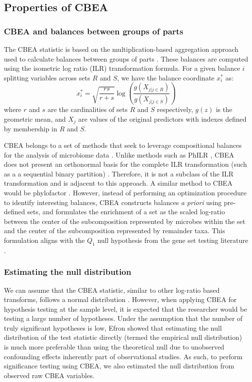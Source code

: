 \documentclass[10pt,letterpaper]{article}
\begin{document}
\subsection*{Properties of CBEA}
\subsubsection*{CBEA and balances between groups of parts}
The CBEA statistic is based on the multiplication-based aggregation approach used to calculate balances between groups of parts \cite{egozcue2005}. These balances are computed using the isometric log ratio (ILR) transformation \cite{egozcue2003} formula. For a given balance $i$ splitting variables across sets $R$ and $S$, we have the balance coordinate $x^{*}_{i}$ as: 
\begin{equation}\label{ilr_standard}
    x^{*}_i = \sqrt{\frac{rs}{r+s}} \log\left(\frac{g(X_{j|j \in R})}{g(X_{j|j \in S})}\right)
\end{equation}
where $r$ and $s$ are the cardinalities of sets $R$ and $S$ respectively, $g(z)$ is the geometric mean, and $X_{j}$ are values of the original predictors with indexes defined by membership in $R$ and $S$. 

CBEA belongs to a set of methods that seek to leverage compositional balances for the analysis of microbiome data \cite{washburne2017, rivera-pinto2018, silverman2017, morton2017}. Unlike methods such as PhILR \cite{silverman2017}, CBEA does not present an orthonormal basis for the complete ILR transformation (such as a a sequential binary partition) \cite{egozcue2003}. Therefore, it is not a subclass of the ILR transformation and is adjacent to this approach. A similar method to CBEA would be phylofactor \cite{washburne2017}. However, instead of performing an optimization procedure to identify interesting balances, CBEA constructs balances \emph{a priori} using pre-defined sets, and formulates the enrichment of a set as the scaled log-ratio between the center of the subcomposition represented by microbes within the set and the center of the subcomposition represented by remainder taxa. This formulation aligns with the $Q_1$ null hypothesis from the gene set testing literature \cite{tian2005}. 

\subsubsection*{Estimating the null distribution}
We can assume that the CBEA statistic, similar to other log-ratio based transforms, follows a normal distribution \cite{egozcue2003, aitchison1980}. However, when applying CBEA for hypothesis testing at the sample level, it is expected that the researcher would be testing a large number of hypotheses. Under the assumption that the number of truly significant hypotheses is low, Efron \cite{efron2004} showed that estimating the null distribution of the test statistic directly (termed the empirical null distribution) is much more preferable than using the theoretical null due to unobserved confounding effects inherently part of observational studies. As such, to perform significance testing using CBEA, we also estimated the null distribution from observed raw CBEA variables. 
\end{document}
